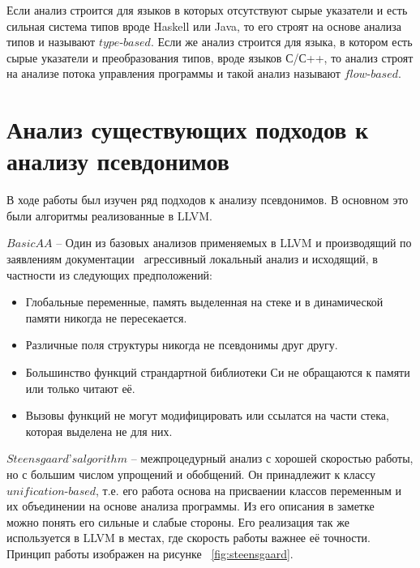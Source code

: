 \begin{mydefinition}
Если анализ строится для языков в которых отсутствуют сырые указатели и есть сильная система типов вроде Haskell или Java, то его строят на основе анализа типов и называют $type$-$based$. Если же анализ строится для языка, в котором есть сырые указатели и преобразования типов, вроде языков С/С++, то анализ строят на анализе потока управления программы и такой анализ называют $flow$-$based$.
\end{mydefinition}

\section{Анализ существующих подходов к анализу псевдонимов}

В ходе работы был изучен ряд подходов к анализу псевдонимов. В основном это были алгоритмы реализованные в LLVM. 

$BasicAA$ -- Один из базовых анализов применяемых в LLVM и производящий по заявлениям документации~\autocite{LLVMAAI} агрессивный локальный анализ и исходящий, в частности из следующих предположений:
\begin{itemize}
\item Глобальные переменные, память выделенная на стеке и в динамической памяти никогда не пересекается.
\item Различные поля структуры никогда не псевдонимы друг другу.
\item Большинство функций страндартной библиотеки Си не обращаются к памяти или только читают её.
\item Вызовы функций не могут модифицировать или ссылатся на части стека, которая выделена не для них.
\end{itemize}

$Steensgaard’s algorithm$ -- межпроцедурный анализ с хорошей скоростью работы, но с большим числом упрощений и обобщений. Он принадлежит к классу $unification$-$based$, т.е. его работа основа на присваении классов переменным и их объединении на основе анализа программы. Из его описания в заметке ~\autocite{SteensgaardsNote} можно понять его сильные и слабые стороны. Его реализация так же используется в LLVM в местах, где скорость работы важнее её точности. Принцип работы изображен на рисунке ~\ref{fig:steensgaard}.

